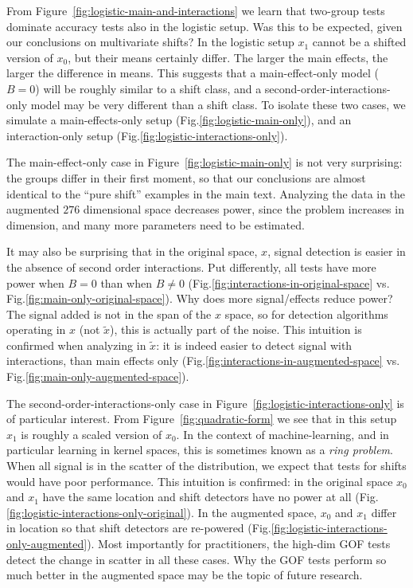 \documentclass[oupdraft]{bio}
\begin{document}
From Figure~\ref{fig:logistic-main-and-interactions} we learn that two-group tests dominate accuracy tests also in the logistic setup.
Was this to be expected, given our conclusions on multivariate shifts?
In the logistic setup $x_1$ cannot be a shifted version of $x_0$, but their means certainly differ. 
The larger the main effects, the larger the difference in means.
This suggests that a main-effect-only model ($B=0$) will be roughly similar to a shift class, and a second-order-interactions-only model may be very different than a shift class.
To isolate these two cases, we simulate a main-effects-only setup (Fig.\ref{fig:logistic-main-only}), and an interaction-only setup (Fig.\ref{fig:logistic-interactions-only}).


The main-effect-only case in Figure~\ref{fig:logistic-main-only} is not very surprising: 
the groups differ in their first moment, so that our conclusions are almost identical to the ``pure shift'' examples in the main text.
Analyzing the data in the augmented $276$ dimensional space decreases power, since the problem increases in dimension, and many more parameters need to be estimated. 

It may also be surprising that in the original space, $x$, signal detection is easier in the absence of second order interactions. 
Put differently, all tests have more power when $B=0$ than when $B \neq 0$ (Fig.\ref{fig:interactions-in-original-space} vs. Fig.\ref{fig:main-only-original-space}). 
Why does more signal/effects reduce power? 
The signal added is not in the span of the $x$ space, so for detection algorithms operating in $x$ (not $\tilde{x}$), this is actually part of the noise. 
This intuition is confirmed when analyzing in $\tilde x$: it is indeed easier to detect signal with interactions, than main effects only (Fig.\ref{fig:interactions-in-augmented-space} vs. Fig.\ref{fig:main-only-augmented-space}).

The second-order-interactions-only case in Figure~\ref{fig:logistic-interactions-only} is of particular interest. 
From Figure~\ref{fig:quadratic-form} we see that in this setup $x_1$ is roughly a scaled version of $x_0$.
In the context of machine-learning, and in particular learning in kernel spaces, this is sometimes known as a \emph{ring problem}.
When all signal is in the scatter of the distribution, we expect that tests for shifts would have poor performance. 
This intuition is confirmed: in the original space $x_0$ and $x_1$ have the same location and shift detectors have no power at all (Fig.\ref{fig:logistic-interactions-only-original}). 
In the augmented space, $x_0$ and $x_1$ differ in location so that shift detectors are re-powered (Fig.\ref{fig:logistic-interactions-only-augmented}). 
Most importantly for practitioners, the high-dim GOF tests detect the change in scatter in all these cases. 
Why the GOF tests perform so much better in the augmented space may be the topic of future research.
\end{document}
